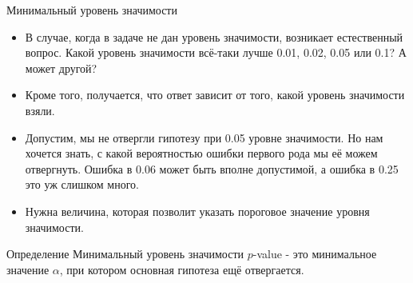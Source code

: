\documentclass[unicode,11pt,notheorems,xcolor=table]{beamer}
\begin{document}
 \begin{frame}{Минимальный уровень значимости}{}
\begin{itemize}
    \item В случае, когда в задаче не дан уровень значимости, возникает естественный вопрос. Какой уровень значимости всё-таки лучше 0.01, 0.02, 0.05 или 0.1? А может другой? 
    \item Кроме того, получается, что ответ зависит от того, какой уровень значимости взяли.
  
    \item Допустим, мы не отвергли гипотезу при 0.05 уровне значимости. Но нам хочется знать, с какой вероятностью ошибки первого рода мы её можем отвергнуть. Ошибка в 0.06 может быть вполне допустимой, а ошибка в 0.25 это уж слишком много.
  
    \item Нужна величина, которая позволит указать пороговое значение уровня значимости. 
  
\end{itemize}
\begin{block}{Определение}
    Минимальный уровень значимости $p$-value - это минимальное значение $\alpha$, при котором основная гипотеза ещё отвергается.
\end{block}
\end{frame}
\end{document}
